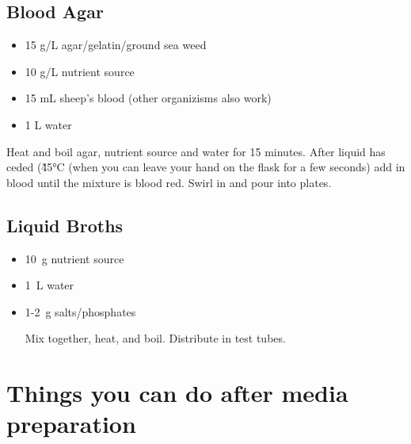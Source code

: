 \subsection{Blood Agar}

\begin{itemize}

\item{15 g/L agar/gelatin/ground sea weed}

\item{10 g/L nutrient source}

\item{15 mL sheep’s blood (other organizisms also work)}

\item{1 L water}

\end{itemize}

Heat and boil agar, nutrient source and water for 15 minutes. After liquid has ceded (\~45°C (when you can leave your hand on the flask for a few seconds) add in blood until the mixture is blood red. Swirl in and pour into plates.

\subsection{Liquid Broths}

\begin{itemize}

\item{10~g nutrient source}

\item{1~L water}

\item{1-2~g salts/phosphates}

Mix together, heat, and boil. Distribute in test tubes.

\end{itemize}

\section{Things you can do after media preparation}


